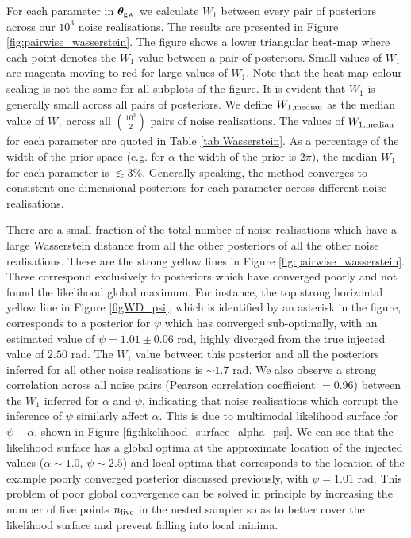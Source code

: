 \documentclass[fleqn,usenatbib,useAMS]{mnras}
\providecommand{\DIFaddbegin}{} %
\newcommand{\DIFaddincludegraphics}[2][]{{\color{blue}\fbox{\DIFOincludegraphics[#1]{#2}}}} %
\DeclareRobustCommand{\DIFaddbegin}{\DIFOaddbegin \let\includegraphics\DIFaddincludegraphics} %
\begin{document}
For each parameter in $\boldsymbol{\theta}_{\rm gw}$ we calculate $W_1$ between every pair of posteriors across our $10^3$ noise realisations. The results are presented in Figure \ref{fig:pairwise_wasserstein}. The figure shows a lower triangular heat-map where each point denotes the $W_1$ value between a pair of posteriors. Small values of $W_1$ are magenta moving to red for large values of $W_1$. Note that the heat-map colour scaling is not the same for all subplots of the figure. It is evident that $W_1$ is generally small across all pairs of posteriors. We define $W_{1, \rm median}$ as the median value of $W_1$ across all $10^3 \choose 2$ pairs of noise realisations. The values of $W_{1, \rm median}$ for each parameter are quoted in Table \ref{tab:Wasserstein}. As a percentage of the width of the prior space (e.g. for $\alpha$ the width of the prior is $2 \pi$), the median $W_1$ for each parameter is $\lesssim 3 \%$. Generally speaking, the method converges to consistent one-dimensional posteriors for each parameter across different noise realisations. \newline


There are a small fraction of the total number of noise realisations which have a large Wasserstein distance from all the other posteriors of all the other noise realisations. These are the strong yellow lines in Figure \ref{fig:pairwise_wasserstein}. These correspond exclusively to posteriors which have converged poorly and not found the likelihood global maximum. For instance, the top strong horizontal yellow line in Figure \ref{figWD_psi}, which is identified by an asterisk in the figure, corresponds to a posterior for $\psi$ which has converged sub-optimally, with an estimated value of $\psi = 1.01 \pm 0.06$ rad, highly diverged from the true injected value of $2.50$ rad. The $W_1$ value between this posterior and all the posteriors inferred for all other noise realisations is $\sim 1.7$ rad. We also observe a strong correlation across all noise pairs (Pearson correlation coefficient $=0.96$) between the $W_1$ inferred for $\alpha$ and $\psi$, indicating that noise realisations which corrupt the inference of $\psi$ similarly affect $\alpha$. This is due to multimodal likelihood surface for $\psi-\alpha$, shown in Figure \ref{fig:likelihood_surface_alpha_psi}. We can see that the likelihood surface has a global optima at the approximate location of the injected values ($\alpha \sim 1.0$, $\psi\sim2.5$) and local optima that corresponds to the location of the example poorly converged posterior discussed previously, with $\psi = 1.01$ rad. This problem of poor global convergence can be solved in principle by increasing the number of live points $n_{\rm live}$ in the nested sampler so as to better cover the likelihood surface and prevent falling into local minima. 
\DIFaddbegin 
\end{document}
